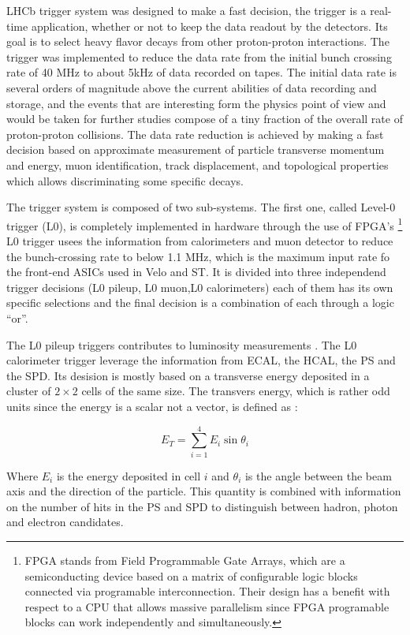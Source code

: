 LHCb trigger system was designed to make a fast decision, the trigger is a real-time application, whether or not to keep the data readout by the detectors. Its goal is to select heavy flavor decays from other proton-proton interactions. The trigger was implemented to reduce the data rate from the initial bunch crossing rate of 40 MHz to about 5kHz of data recorded on tapes. The initial data rate is several orders of magnitude above the current abilities of data recording and storage, and the events that are interesting form the physics point of view and would be taken for further studies compose of a tiny fraction of the overall rate of proton-proton collisions.  The data rate reduction is achieved by making a fast decision based on approximate measurement of particle transverse momentum and energy, muon identification, track displacement, and topological properties which allows discriminating some specific decays. 

The trigger system is composed of two sub-systems. The first one, called Level-0 trigger (L0), is completely implemented in hardware through the use of FPGA’s \footnote{FPGA stands from Field Programmable Gate Arrays, which are a semiconducting device based on a matrix of configurable logic blocks connected via programable interconnection. Their design has a benefit with respect to a CPU that allows massive parallelism since FPGA programable blocks can work independently and simultaneously. } L0 trigger usees the information from calorimeters and muon detector to reduce the bunch-crossing rate to below 1.1 MHz, which is the maximum input rate fo the front-end ASICs used in Velo and ST.  It is divided into three independend trigger decisions (L0 pileup, L0 muon,L0 calorimeters) each of them has its own specific selections and the final decision is a combination of each through a logic “or”. 

The L0 pileup triggers contributes to luminosity measurements \cite{trigger}.
The L0 calorimeter trigger leverage the information from ECAL, the HCAL, the PS and the SPD. Its desision is mostly based on a transverse energy deposited in a cluster of $2\times 2$ cells of the same size. The transvers energy, which is rather odd units since the energy is a scalar not a vector, is defined as :

\begin{equation}
    E_T = \sum_{i=1}^{4} E_i \sin\theta_i
\end{equation}

Where $E_i$ is the energy deposited in cell $i$ and $\theta_i$ is the angle between the beam axis and the direction of the particle. 
This quantity is combined with information on the number of hits in the PS and SPD to distinguish between hadron, photon and electron candidates. 


